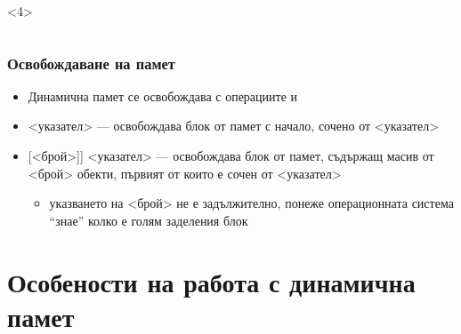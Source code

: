 \documentclass{beamer}
\begin{document}
\begin{frame}[fragile]
\begin{columns}[T,onlytextwidth]
\begin{column}{.5\textwidth}
\begin{overlayarea}{.5\textwidth}{16em}
        \begin{onlyenv}<4>
        \end{onlyenv}        
      \end{overlayarea}
  \end{column}
  \end{columns}
\end{frame}

\begin{frame}
  \frametitle{Освобождаване на памет}
  
  \begin{itemize}[<+->]
  \item Динамична памет се освобождава с операциите  и 
  \item {}<указател> --- освобождава блок от памет с начало, сочено от <указател>
  \item \tta{delete[}[<брой>]\tta] <указател> --- освобождава блок от памет, съдържащ масив от <брой> обекти, първият от които е сочен от <указател>
    \begin{itemize}
    \item указването на <брой> не е задължително, понеже операционната система ``знае'' колко е голям заделения блок
    \end{itemize}
  \end{itemize}
\end{frame}

\section{Особености на работа с динамична памет}
\end{document}
